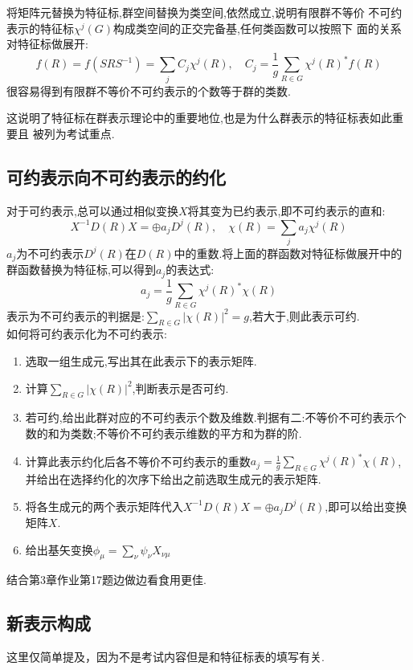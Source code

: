 \documentclass{ctexart}
\begin{document}
\noindent 将矩阵元替换为特征标,群空间替换为类空间,依然成立,说明有限群不等价
不可约表示的特征标$\chi^{j}(G)$构成类空间的正交完备基,任何类函数可以按照下
面的关系对特征标做展开:
\[
f(R)=f(SRS^{-1})=\sum_{j}C_{j}\chi^{j}(R),\quad C_{j}=\frac{1}{g}\sum_{R\in G}\chi^{j}(R)^{*}f(R)
\]
很容易得到有限群不等价不可约表示的个数等于群的类数.

这说明了特征标在群表示理论中的重要地位,也是为什么群表示的特征标表如此重要且
被列为考试重点.

\subsection{可约表示向不可约表示的约化}

对于可约表示,总可以通过相似变换$X$将其变为已约表示,即不可约表示的直和:
\[
X^{-1}D(R)X=\oplus a_{j}D^{j}(R), \quad \chi(R)=\sum_{j}a_{j}\chi^{j}(R)
\]
$a_{j}$为不可约表示$D^{j}(R)$在$D(R)$中的重数.将上面的群函数对特征标做展开中的群函数替换为特征标,可以得到$a_{j}$的表达式:
\[
a_{j}=\frac{1}{g}\sum_{R\in G} \chi^{j}(R)^{*}\chi(R)
\]
表示为不可约表示的判据是:$\sum_{R\in G}\left|\chi(R)\right|^{2}=g$,若大于,则此表示可约.\\

如何将可约表示化为不可约表示:
\begin{enumerate}
    \item 选取一组生成元,写出其在此表示下的表示矩阵.
    \item 计算$\sum_{R\in G}\left|\chi(R)\right|^{2}$,判断表示是否可约.
    \item 若可约,给出此群对应的不可约表示个数及维数.判据有二:不等价不可约表示个数的和为类数;不等价不可约表示维数的平方和为群的阶.
    \item 计算此表示约化后各不等价不可约表示的重数$a_{j}=\frac{1}{g}\sum_{R\in G} \chi^{j}(R)^{*}\chi(R)$,并给出在选择约化的次序下给出之前选取生成元的表示矩阵.
    \item 将各生成元的两个表示矩阵代入$X^{-1}D(R)X=\oplus a_{j}D^{j}(R)$,即可以给出变换矩阵$X$.
    \item 给出基矢变换$\phi_{\mu}=\sum_{\nu}\psi_{\nu}X_{\nu\mu}$
\end{enumerate}

结合第3章作业第17题边做边看食用更佳.

\subsection{新表示构成}
这里仅简单提及，因为不是考试内容但是和特征标表的填写有关.
\end{document}

